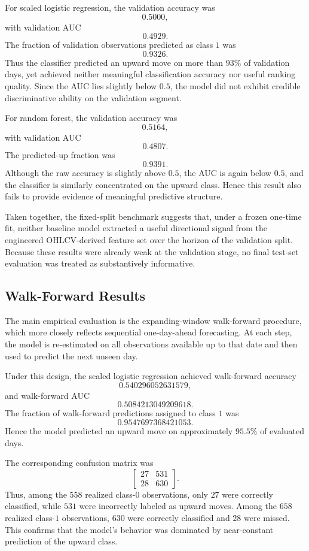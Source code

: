 \documentclass[11pt,a4paper]{article}
\begin{document}
	For scaled logistic regression, the validation accuracy was
	\[
	0.5000,
	\]
	with validation AUC
	\[
	0.4929.
	\]
	The fraction of validation observations predicted as class \(1\) was
	\[
	0.9326.
	\]
	Thus the classifier predicted an upward move on more than \(93\%\) of validation days, yet achieved neither meaningful classification accuracy nor useful ranking quality. Since the AUC lies slightly below \(0.5\), the model did not exhibit credible discriminative ability on the validation segment.
	
	For random forest, the validation accuracy was
	\[
	0.5164,
	\]
	with validation AUC
	\[
	0.4807.
	\]
	The predicted-up fraction was
	\[
	0.9391.
	\]
	Although the raw accuracy is slightly above \(0.5\), the AUC is again below \(0.5\), and the classifier is similarly concentrated on the upward class. Hence this result also fails to provide evidence of meaningful predictive structure.
	
	Taken together, the fixed-split benchmark suggests that, under a frozen one-time fit, neither baseline model extracted a useful directional signal from the engineered OHLCV-derived feature set over the horizon of the validation split. Because these results were already weak at the validation stage, no final test-set evaluation was treated as substantively informative.
	
	\subsection{Walk-Forward Results}
	
	The main empirical evaluation is the expanding-window walk-forward procedure, which more closely reflects sequential one-day-ahead forecasting. At each step, the model is re-estimated on all observations available up to that date and then used to predict the next unseen day.
	
	Under this design, the scaled logistic regression achieved walk-forward accuracy
	\[
	0.540296052631579,
	\]
	and walk-forward AUC
	\[
	0.5084213049209618.
	\]
	The fraction of walk-forward predictions assigned to class \(1\) was
	\[
	0.9547697368421053.
	\]
	Hence the model predicted an upward move on approximately \(95.5\%\) of evaluated days.
	
	The corresponding confusion matrix was
	\[
	\begin{bmatrix}
		27 & 531 \\
		28 & 630
	\end{bmatrix}.
	\]
	Thus, among the \(558\) realized class-\(0\) observations, only \(27\) were correctly classified, while \(531\) were incorrectly labeled as upward moves. Among the \(658\) realized class-\(1\) observations, \(630\) were correctly classified and \(28\) were missed. This confirms that the model's behavior was dominated by near-constant prediction of the upward class.
	
\end{document}
